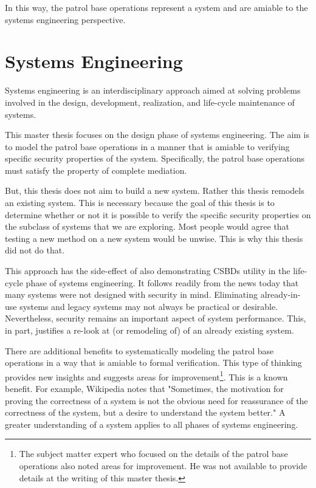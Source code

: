 \documentclass[../../main/main.tex]{subfiles}
\begin{document}
In this way, the patrol base operations represent a system and are amiable to the systems engineering perspective.  

\section{Systems Engineering}\label{sec:se}
Systems engineering is an interdisciplinary approach aimed at solving problems involved in the design, development, realization, and life-cycle maintenance of systems.
  
  
 This master thesis focuses on the design phase of systems engineering.   The aim is to model the patrol base operations in a manner that is amiable to verifying specific security properties of the system.  Specifically, the patrol base operations must satisfy the property of complete mediation. 


But, this thesis does not aim to build a new system.  Rather this thesis remodels an existing system.   This is necessary because the goal of this thesis is to determine whether or not it is possible to verify the specific security properties on the subclass of systems that we are exploring.  Most people would agree that testing a new method on a new system would be unwise.  This is why this thesis did not do that.    


This approach has the side-effect of also demonstrating CSBDs utility in the life-cycle phase of systems engineering.  It follows readily from the news today that many systems were not designed with security in mind.  Eliminating already-in-use systems and legacy systems may not always be practical or desirable.  Nevertheless, security remains an important aspect of system performance.  This, in part, justifies a re-look at (or remodeling of)  of an already existing system.


There are additional benefits to systematically modeling the patrol base operations in a way that is amiable to formal verification.  This type of thinking provides new insights and suggests areas for improvement\footnote{The subject matter expert who focused on the details of the patrol base operations also noted areas for improvement.  He was not available to provide details at the writing of this master thesis.}.  This is a known benefit.  For example, Wikipedia \cite{wikiformalmethods} notes that "Sometimes, the motivation for proving the correctness of a system is not the obvious need for reassurance of the correctness of the system, but a desire to understand the system better."  A greater understanding of a system applies to all phases of systems engineering.
\end{document}

